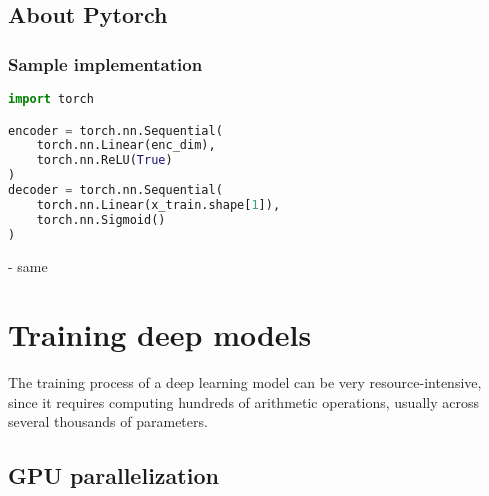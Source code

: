 \subsection{About Pytorch}

\subsubsection{Sample implementation}

\begin{lstlisting}[language=Python]
import torch

encoder = torch.nn.Sequential(
    torch.nn.Linear(enc_dim),
    torch.nn.ReLU(True)
)
decoder = torch.nn.Sequential(
    torch.nn.Linear(x_train.shape[1]),
    torch.nn.Sigmoid()
)
\end{lstlisting}

- same

\section{Training deep models}

The training process of a deep learning model can be very resource-intensive, since it requires computing hundreds of arithmetic operations, usually across several thousands of parameters. 

\subsection{GPU parallelization}
